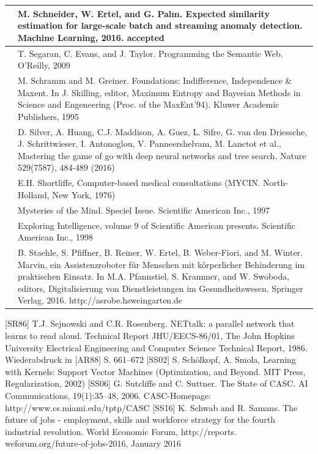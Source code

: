 \documentclass[10pt]{book}
\begin{document}
\begin{tabular}{|l|l|}
\hline [SEP16] & M. Schneider, W. Ertel, and G. Palm. Expected similarity estimation for large-scale batch and streaming anomaly detection. Machine Learning, 2016. accepted \\
\hline [SET09] & T. Segaran, C. Evans, and J. Taylor. Programming the Semantic Web. O'Reilly, 2009 \\
\hline [\cite{schramm1995foundations}] & M. Schramm and M. Greiner. Foundations: Indifference, Independence \& Maxent. In J. Skilling, editor, Maximum Entropy and Bayesian Methods in Science and Engeneering (Proc. of the MaxEnt'94). Kluwer Academic Publishers, 1995 \\
\hline [SHM+16] & D. Silver, A. Huang, C.J. Maddison, A. Guez, L. Sifre, G. van den Driessche, J. Schrittwieser, I. Antonoglou, V. Panneershelvam, M. Lanctot et al., Mastering the game of go with deep neural networks and tree search. Nature 529(7587), 484-489 (2016) \\
\hline [Sho76] & E.H. Shortliffe, Computer-based medical consultations (MYCIN. North-Holland, New York, 1976) \\
\hline [Spe97] & Mysteries of the Mind. Speciel Issue. Scientific American Inc., 1997 \\
\hline [Spe98] & Exploring Intelligence, volume 9 of Scientific American presents. Scientific American Inc., 1998 \\
\hline [SPR+16] & B. Staehle, S. Pfiffner, B. Reiner, W. Ertel, B. Weber-Fiori, and M. Winter. Marvin, ein Assistenzroboter für Menschen mit körperlicher Behinderung im praktischen Einsatz. In M.A. Pfannstiel, S. Krammer, and W. Swoboda, editors, Digitalisierung von Dienstleistungen im Gesundheitswesen. Springer Verlag, 2016. http://asrobe.hsweingarten.de \\
\hline
\hline
\end{tabular}
[SR86] T.J. Sejnowski and C.R. Rosenberg. NETtalk: a parallel network that learns to read aloud. Technical Report JHU/EECS-86/01, The John Hopkins University Electrical Engineering and Computer Science Technical Report, 1986. Wiederabdruck in [AR88] S. 661–672
[SS02] S. Schölkopf, A. Smola, Learning with Kernels: Support Vector Machines (Optimization, and Beyond. MIT Press, Regularization, 2002)
[SS06] G. Sutcliffe and C. Suttner. The State of CASC. AI Communications, 19(1):35–48, 2006. CASC-Homepage: http://www.cs.miami.edu/tptp/CASC
[SS16] K. Schwab and R. Samans. The future of jobs - employment, skills and workforce strategy for the fourth industrial revolution. World Economic Forum, http://reports. weforum.org/future-of-jobs-2016, January 2016
\end{document}
